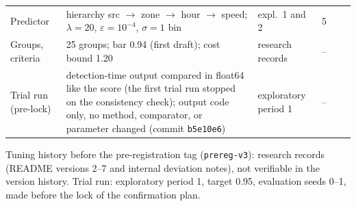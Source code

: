 \begin{tabular}{@{}lp{6.2cm}p{3.6cm}lrr@{}}
\midrule
Predictor & hierarchy src $\to$ zone $\to$ hour $\to$ speed; $\lambda = 20$, $\varepsilon = 10^{-4}$, $\sigma = 1$ bin & expl.\ 1 and 2 & 5 & & \\
Groups, criteria & 25 groups; bar 0.94 (first draft); cost bound 1.20 & research records & -- & & \\
\midrule
Trial run (pre-lock) & detection-time output compared in float64 like the score (the first trial run stopped on the consistency check); output code only, no method, comparator, or parameter changed (commit \texttt{b5e10e6}) & exploratory period 1 & -- & & \\
\bottomrule
\end{tabular}

\smallskip\parbox{\textwidth}{\footnotesize Tuning history before the pre-registration tag (\texttt{prereg-v3}): research records (README versions 2--7 and internal deviation notes), not verifiable in the version history. Trial run: exploratory period 1, target 0.95, evaluation seeds 0--1, made before the lock of the confirmation plan.}
